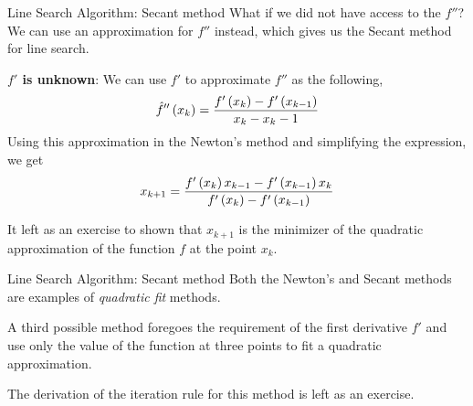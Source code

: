 \documentclass[aspectratio=169]{beamer}
\let\olditem\item
\renewcommand{\item}{\setlength{\itemsep}{\fill}\olditem}
\def\lp{\ensuremath\left(}
\def\rp{\ensuremath\right)}
\def\lc{\ensuremath\left\{}
\def\rc{\ensuremath\right\}}
\newcommand{\ct}[1]{\lp #1\rp}
\begin{document}
\begin{frame}{Line Search Algorithm: Secant method}
  What if we did not have access to the $f''$? We can use an approximation for $f''$ instead, which gives us the Secant method for line search.
  \vspace{0.25cm}

  \textbf{$f'$ is unknown}: We can use $f'$ to approximate $f''$ as the following,
  \[ \hat{f}''\ct{x_k} = \frac{f'\ct{x_k} - f'\ct{x_{k-1}}}{x_k - x{_k-1}} \] 
  Using this approximation in the Newton's method and simplifying the expression, we get
  \[ x_{k+1} = \frac{f'\ct{x_k}x_{k-1} - f'\ct{x_{k-1}}x_k}{f'\ct{x_k} - f'\ct{x_{k - 1}}} \]

  It left as an exercise to shown that $x_{k+1}$ is the minimizer of the quadratic approximation of the function $f$ at the point $x_k$.

\end{frame}


\begin{frame}{Line Search Algorithm: Secant method}
  Both the Newton's and Secant methods are examples of \textit{quadratic fit} methods. 
  \vspace{0.25cm}
  
  A third possible method foregoes the requirement of the first derivative $f'$ and use only the value of the function at three points to fit a quadratic approximation. 
  \vspace{0.25cm}
  
  The derivation of the iteration rule for this method is left as an exercise.
\end{frame}





  
\end{document}
